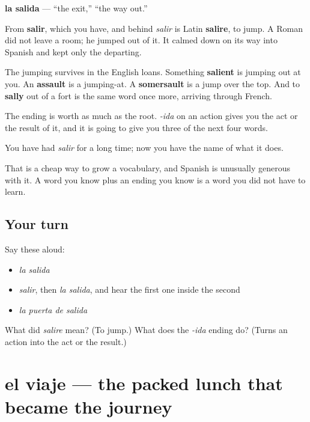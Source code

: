 \begin{cousinweb}
\textbf{la salida} — \textquotedblleft{}the exit,\textquotedblright{} \textquotedblleft{}the way out.\textquotedblright{}

From \textbf{salir}, which you have, and behind \emph{salir} is Latin \textbf{salire}, to jump. A Roman did not leave a room; he jumped out of it. It calmed down on its way into Spanish and kept only the departing.

The jumping survives in the English loans. Something \textbf{salient} is jumping out at you. An \textbf{assault} is a jumping-at. A \textbf{somersault} is a jump over the top. And to \textbf{sally} out of a fort is the same word once more, arriving through French.

The ending is worth as much as the root. \emph{-ida} on an action gives you the act or the result of it, and it is going to give you three of the next four words.
\end{cousinweb}

\begin{grammarlens}[title={What you've built}]
You have had \emph{salir} for a long time; now you have the name of what it does.

That is a cheap way to grow a vocabulary, and Spanish is unusually generous with it. A word you know plus an ending you know is a word you did not have to learn.
\end{grammarlens}

\subsection*{Your turn}
Say these aloud:

\begin{itemize}
\raggedright
  \item \emph{la salida}
  \item \emph{salir}, then \emph{la salida}, and hear the first one inside the second
  \item \emph{la puerta de salida}
\end{itemize}

\begin{tcolorbox}[breakable,colback=teal!4,colframe=teal!35!black,title={Before you move on}]
What did \emph{salire} mean? (To jump.) What does the \emph{-ida} ending do? (Turns an action into the act or the result.)
\end{tcolorbox}
\section[el viaje]{el viaje — the packed lunch that became the journey}

